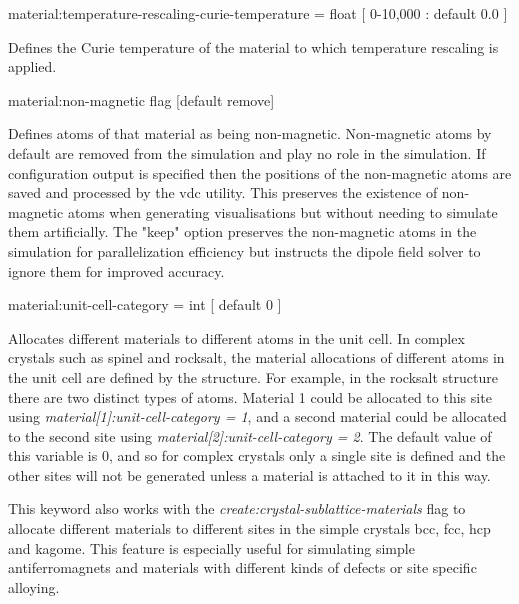 {\zicf material:temperature-rescaling-curie-temperature = float [ 0-10,000 : default 0.0 ]} Defines the Curie temperature of the material to which temperature rescaling is applied.

{\zicf material:non-magnetic flag [default remove]} Defines atoms of
that material as being non-magnetic. Non-magnetic atoms by default are removed from the simulation and play no role in the simulation. If configuration output is specified then the positions of the non-magnetic atoms are saved and processed by the vdc utility. This preserves the existence of non-magnetic atoms when generating visualisations but without needing to simulate them artificially. The "keep" option preserves the non-magnetic atoms in the simulation for parallelization efficiency but instructs the dipole field solver to ignore them for improved accuracy.


{\zicf material:unit-cell-category = int [ default 0 ]} Allocates different materials to different atoms in the unit cell. In complex crystals such as spinel and rocksalt, the material allocations of
different atoms in the unit cell are defined by the structure. For example, in the rocksalt structure there are two distinct types of atoms. Material 1 could be allocated to this site using \textit{material[1]:unit-cell-category = 1}, and a second material could be allocated to the second site using
\textit{material[2]:unit-cell-category = 2}. The default value of this variable is 0, and so for complex crystals only a single site is defined and the other sites will not be generated unless a material is attached to it in this way.

This keyword also works with the \textit{create:crystal-sublattice-materials} flag to allocate different materials to different sites in the simple crystals bcc, fcc, hcp and kagome. This feature is especially useful for simulating simple antiferromagnets and materials with different kinds of defects or site specific alloying.

